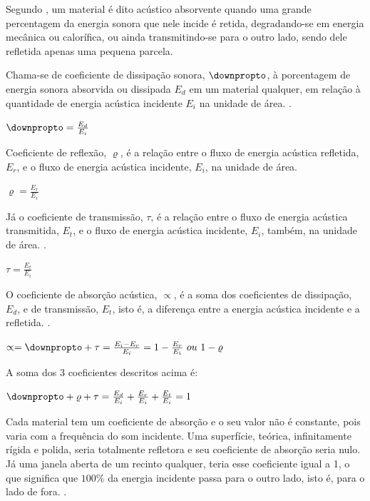 Segundo \cite[pág.~126]{silva}, um material é dito acústico absorvente quando uma grande percentagem da energia sonora que nele incide é retida, degradando-se em energia mecânica ou calorífica, ou ainda transmitindo-se para o outro lado, sendo dele refletida apenas uma pequena parcela.

Chama-se de coeficiente de dissipação sonora, $ \downpropto $, à porcentagem de energia sonora absorvida ou dissipada $ E_{d} $ em um material qualquer, em relação à quantidade de energia acústica  incidente $ E_{i} $ na unidade de área. \cite[pág.~126]{silva}.

\begin{center}
{\Large $ \downpropto = \frac{ E_{d}}{ E_{i}} $}
\end{center}

Coeficiente de reflexão, $ \varrho $, é a relação entre o fluxo de energia acústica refletida, $ E_{r} $, e o fluxo de energia acústica incidente, $ E_{i} $, na unidade de área. \cite[pág.~232]{bistafa}

\begin{center}
{\Large $ \varrho = \frac{E_{r}}{E_{i}} $}
\end{center}

Já o coeficiente de transmissão, $ \tau $, é a relação entre o fluxo de energia acústica transmitida, $ E_{t} $, e o fluxo de energia acústica incidente, $ E_{i} $, também, na unidade de área. \cite[pág.~127]{silva}.
\begin{center}
{\Large $ \tau = \frac{E_{t}}{E_{i}} $}
\end{center}

O coeficiente de absorção acústica, $ \propto $, é a soma dos coeficientes de dissipação, $ E_{d} $, e de transmissão, $ E_{t} $, isto é, a diferença entre a energia acústica incidente e a refletida. \cite[pág.~231]{bistafa}.

\begin{center}
{\Large $ \propto = \downpropto + \tau = \frac{E_{i} - E_{r}}{E_{i}} = 1 - \frac{E_{r}}{E_{i}}~ou~1 - \varrho $}
\end{center}

A soma dos 3 coeficientes descritos acima é:

\begin{center}
{\Large $ \downpropto + \varrho + \tau = \frac{E_{d}}{E_{i}} + \frac{E_{r}}{E_{i}} + \frac{E_{t}}{E_{i}} = 1 $}
\end{center}

Cada material tem um coeficiente de absorção e o seu valor não é constante, pois varia com a frequência do som incidente. Uma superfície, teórica, infinitamente rígida e polida, seria totalmente refletora e seu coeficiente de absorção seria nulo. Já uma janela aberta de um recinto qualquer, teria esse coeficiente igual a 1, o que significa que $ 100\% $ da energia incidente passa para o outro lado, isto é, para o lado de fora. \cite{silva}.

